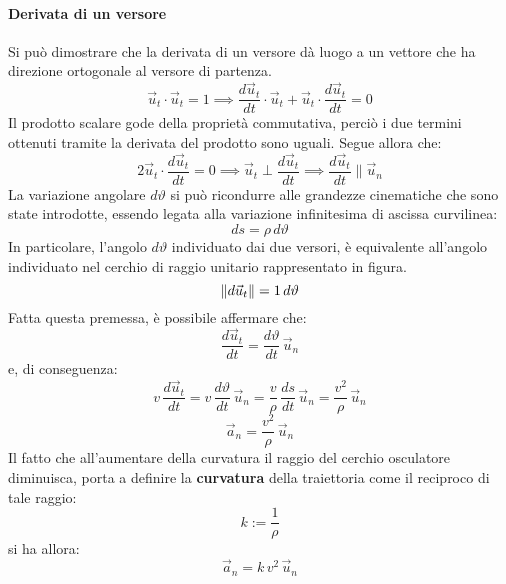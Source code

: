 \documentclass[10pt,a4paper]{book}
\DeclarePairedDelimiter{\norma}{\lVert}{\rVert} %
\begin{document}
\paragraph{Derivata di un versore} Si può dimostrare che la derivata di un versore dà luogo a un vettore che ha direzione ortogonale al versore di partenza.
\[
	\vec{u}_t\cdot\vec{u}_t=1 \implies \frac{d\vec{u}_t}{dt}\cdot \vec{u}_t+ \vec{u}_t\cdot \frac{d\vec{u}_t}{dt}=0
\]
Il prodotto scalare gode della proprietà commutativa, perciò i due termini ottenuti tramite la derivata del prodotto sono uguali. Segue allora che:
\[
	2\vec{u}_t\cdot\frac{d\vec{u}_t}{dt}=0 \implies \vec{u}_t\perp \frac{d\vec{u}_t}{dt} \implies \frac{d\vec{u}_t}{dt} \parallel \vec{u}_n
\]
La variazione angolare $d\vartheta$ si può ricondurre alle grandezze cinematiche che sono state introdotte, essendo legata alla variazione infinitesima di ascissa curvilinea:
\[
	ds=\rho\,d\vartheta
\]
In particolare, l'angolo $d\vartheta$ individuato dai due versori, è equivalente all'angolo individuato nel cerchio di raggio unitario rappresentato in figura.
\[
	\norma{d\vec{u}_t}=1\,d\vartheta
\]
Fatta questa premessa, è possibile affermare che:
\[
	\frac{d\vec{u}_t}{dt}=\frac{d\vartheta}{dt}\,\vec{u}_n
\]
e, di conseguenza:
\[
	v\,\frac{d\vec{u}_t}{dt}= v\,\frac{d\vartheta}{dt}\,\vec{u}_n=\frac{v}{\rho}\,\frac{ds}{dt}\,\vec{u}_n=\frac{v^2}{\rho}\,\vec{u}_n
\]
\begin{equation}
	\boxed{\vec{a}_n=\frac{v^2}{\rho}\,\vec{u}_n}
\end{equation}
Il fatto che all'aumentare della curvatura il raggio del cerchio osculatore diminuisca, porta a definire la \textbf{curvatura} della traiettoria come il reciproco di tale raggio:
\[
	k:=\frac{1}{\rho}
\]
si ha allora:
\[
	\vec{a}_n=k\,{v^2}\,\vec{u}_n
\]
\end{document}
